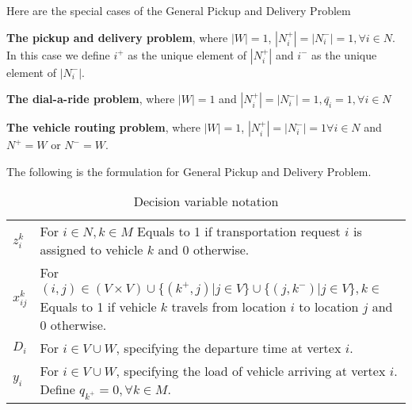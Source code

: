 				Here are the special cases of the General Pickup and Delivery Problem
				\begin{example}
					\textbf{The pickup and delivery problem}, where $|W| = 1$, $|N_i^+| = |N_i^-| = 1, \forall i \in N$. In this case we define $i^+$ as the unique element of $|N_i^+|$ and $i^-$ as the unique element of $|N_i^-|$.
				\end{example}

				\begin{example}
					\textbf{The dial-a-ride problem}, where $|W| = 1$ and $|N_i^+| = |N_i^-| = 1, \bar{q_i} = 1, \forall i \in N$
				\end{example}

				\begin{example}
					\textbf{The vehicle routing problem}, where $|W| = 1$, $|N_i^+| = |N_i^-| = 1 \forall i \in N$ and $N^+ = W$ or $N^- = W$.
				\end{example}



				The following is the formulation for General Pickup and Delivery Problem.

				\begin{table}[!htp]
					\centering
					\caption{Decision variable notation}
					\begin{tabular}{l p{5in}}
						\hline
						$z_i^k$ & For $i \in N, k \in M$ Equals to 1 if transportation request $i$ is assigned to vehicle $k$ and 0 otherwise. \\
						$x_{ij}^k$ & For $(i, j) \in (V \times V) \cup \{(k^+, j)| j \in V\} \cup \{(j, k^-)|j \in V\}, k \in $ Equals to 1 if vehicle $k$ travels from location $i$ to location $j$ and 0 otherwise.\\
						$D_i$ & For $i \in V\cup W$, specifying the departure time at vertex $i$.\\
						$y_i$ & For $i \in V\cup W$, specifying the load of vehicle arriving at vertex $i$. Define $q_{k^+} = 0, \forall k \in M$.\\
						\hline	
					\end{tabular}
				\end{table}

